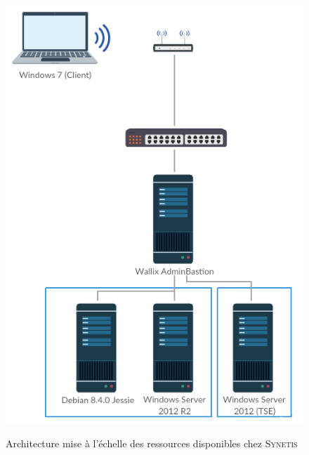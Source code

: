 \begin{figure}[!ht]
    \center
    \includegraphics[width=\textwidth]{./images/PoC_archi_reelle.png}
    \label{fig:archi_reelle}
    \caption{Architecture mise à l'échelle des ressources disponibles chez \textsc{Synetis}}
\end{figure}